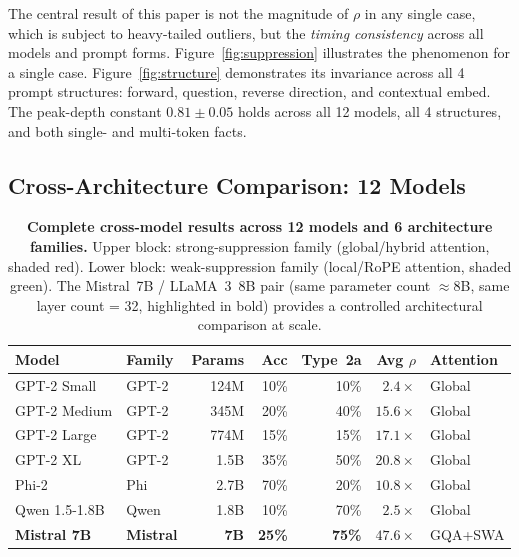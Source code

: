 \documentclass{article}
\begin{document}
The central result of this paper is not the magnitude of $\rho$ in any
single case, which is subject to heavy-tailed outliers, but the
\emph{timing consistency} across all models and prompt forms.
Figure~\ref{fig:suppression} illustrates the phenomenon for a single case.
Figure~\ref{fig:structure} demonstrates its invariance across all 4 prompt
structures: forward, question, reverse direction, and contextual embed.
The peak-depth constant $0.81\pm0.05$ holds across all 12 models, all 4
structures, and both single- and multi-token facts.

\subsection{Cross-Architecture Comparison: 12 Models}

\begin{table}[htbp]
\caption{\textbf{Complete cross-model results across 12 models and 6
architecture families.}
Upper block: strong-suppression family (global/hybrid attention, shaded red).
Lower block: weak-suppression family (local/RoPE attention, shaded green).
The Mistral~7B / LLaMA~3~8B pair (same parameter count $\approx$8B,
same layer count = 32, highlighted in bold) provides a controlled
architectural comparison at scale.}
\label{tab:models}
\centering\small
\setlength{\tabcolsep}{5pt}
\begin{tabular}{llrrrrl}
\toprule
\textbf{Model} & \textbf{Family} & \textbf{Params}
  & \textbf{Acc} & \textbf{Type~2a} & \textbf{Avg $\rho$}
  & \textbf{Attention} \\
\midrule
\rowcolor{rowred}
GPT-2 Small    & GPT-2   & 124M & 10\% & 10\% & $2.4\times$  & Global \\
\rowcolor{rowred}
GPT-2 Medium   & GPT-2   & 345M & 20\% & 40\% & $15.6\times$ & Global \\
\rowcolor{rowred}
GPT-2 Large    & GPT-2   & 774M & 15\% & 15\% & $17.1\times$ & Global \\
\rowcolor{rowred}
GPT-2 XL       & GPT-2   & 1.5B & 35\% & 50\% & $20.8\times$ & Global \\
\rowcolor{rowred}
Phi-2          & Phi     & 2.7B & 70\% & 20\% & $10.8\times$ & Global \\
\rowcolor{rowred}
Qwen 1.5-1.8B  & Qwen    & 1.8B & 10\% & 70\% & $2.5\times$  & Global \\
\rowcolor{rowred}
\textbf{Mistral 7B} & \textbf{Mistral} & \textbf{7B}
  & \textbf{25\%} & \textbf{75\%} & $\mathbf{47.6\times}$ & GQA+SWA \\

\end{tabular}
\end{table}
\end{document}
